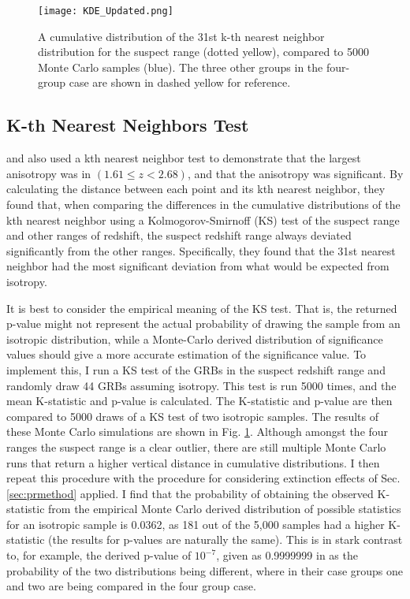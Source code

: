 \documentclass[fleqn,usenatbib]{mnras}
\begin{document}
\begin{figure}
    \centering
    \texttt{[image: KDE\_Updated.png]}
    \caption{A cumulative distribution of the 31st k-th nearest neighbor distribution for the suspect range (dotted yellow), compared to 5000 Monte Carlo samples (blue). The three other groups in the four-group case are shown in dashed yellow for reference.}
    \label{fig:KDE_nneighbor}
\end{figure}
\subsection{K-th Nearest Neighbors Test}
\label{sec:kthnearestneighbor}
\citet{horvath2014} and \citet{horvath2015} also used a kth nearest neighbor test to demonstrate that the largest anisotropy was in \((1.61 \leq z < 2.68)\), and that the anisotropy was significant. By calculating the distance between each point and its kth nearest neighbor, they found that, when comparing the differences in the cumulative distributions of the kth nearest neighbor using a Kolmogorov-Smirnoff (KS) test of the suspect range and other ranges of redshift, the suspect redshift range always deviated significantly from the other ranges. Specifically, they found that the 31st nearest neighbor had the most significant deviation from what would be expected from isotropy.

It is best to consider the empirical meaning of the KS test. That is, the returned p-value might not represent the actual probability of drawing the sample from an isotropic distribution, while a Monte-Carlo derived distribution of significance values should give a more accurate estimation of the significance value. To implement this, I run a KS test of the GRBs in the suspect redshift range and randomly draw 44 GRBs assuming isotropy. This test is run 5000 times, and the mean K-statistic and p-value is calculated. The K-statistic and p-value are then compared to 5000 draws of a KS test of two isotropic samples. The results of these Monte Carlo simulations are shown in Fig. \ref{fig:KDE_nneighbor}. Although amongst the four ranges the suspect range is a clear outlier, there are still multiple Monte Carlo runs that return a higher vertical distance in cumulative distributions. I then repeat this procedure with the procedure for considering extinction effects of Sec. \ref{sec:prmethod} applied. I find that the probability of obtaining the observed K-statistic from the empirical Monte Carlo derived distribution of possible statistics for an isotropic sample is 0.0362, as 181 out of the 5,000 samples had a higher K-statistic (the results for p-values are naturally the same). This is in stark contrast to, for example, the derived p-value of $10^{-7}$, given as 0.9999999 in \citet{horvath2015} as the probability of the two distributions being different, where in their case groups one and two are being compared in the four group case.
\end{document}
